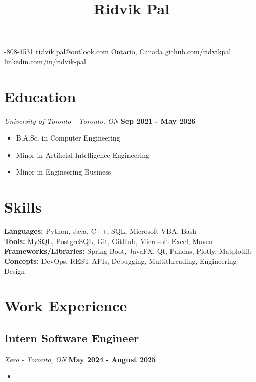 \documentclass{article}
\begin{document}
\title{\vspace{-1.5cm}Ridvik Pal\vspace{-1.5cm}}
\date{}
-808-4531
\hfill
\href{mailto:ridvik.pal@outlook.com}{ridvik.pal@outlook.com}
\hfill
Ontario, Canada
\hfill
\href{https://github.com/ridvikpal}{github.com/ridvikpal}
\hfill
\href{https://www.linkedin.com/in/ridvik-pal}{linkedin.com/in/ridvik-pal}

\section*{Education}

\textit{University of Toronto - Toronto, ON}
\hfill
\textbf{Sep 2021 - May 2026}
\begin{itemize}
    \item B.A.Sc. in Computer Engineering
    \item Minor in  Artificial Intelligence Engineering
    \item Minor in Engineering Business
\end{itemize}

\section*{Skills}

\textbf{Languages:} Python, Java, C++, SQL, Microsoft VBA, Bash \\
\textbf{Tools:} MySQL, PostgreSQL, Git, GitHub, Microsoft Excel, Maven \\
\textbf{Frameworks/Libraries:} Spring Boot, JavaFX, Qt, Pandas, Plotly, Matplotlib \\
\textbf{Concepts:} DevOps, REST APIs, Debugging, Multithreading, Engineering Design

\section*{Work Experience}

\subsection*{Intern Software Engineer}
\textit{Xero - Toronto, ON}
\hfill
\textbf{May 2024 - August 2025}
\begin{itemize}
    \item 
\end{itemize}
\end{document}
